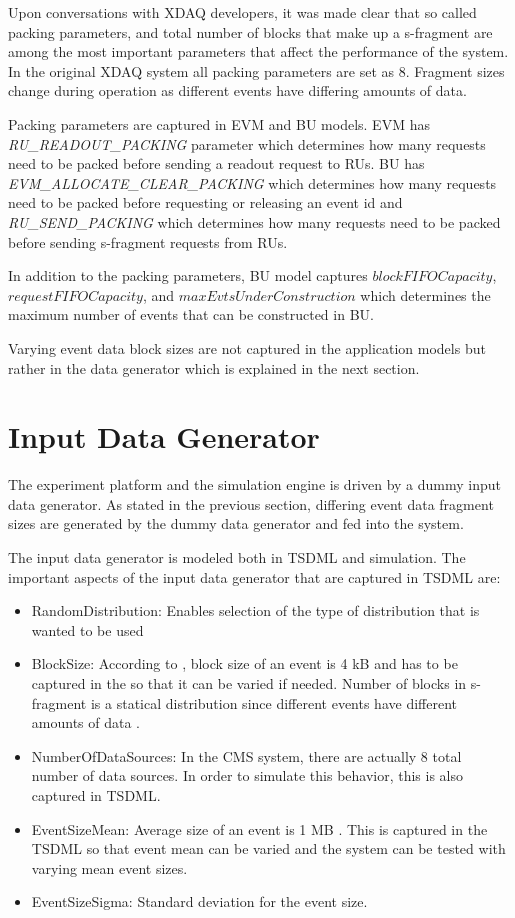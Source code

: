 Upon conversations with XDAQ developers, it was made clear that so called packing parameters, and total number of blocks that make up a s-fragment are among the most important parameters that affect the performance of the system. In the original XDAQ system all packing parameters are set as $8$. Fragment sizes change during operation as different events have differing amounts of data. 

Packing parameters are captured in EVM and BU models. EVM has \textit{RU\_READOUT\_PACKING} parameter which determines how many requests need to be packed before sending a readout request to RUs. BU has \textit{EVM\_ALLOCATE\_CLEAR\_PACKING} which determines how many requests need to be packed before requesting or releasing an event id  and \textit{RU\_SEND\_PACKING} which determines how many requests need to be packed before sending s-fragment requests from RUs.

In addition to the packing parameters, BU model captures $blockFIFOCapacity$, $requestFIFOCapacity$, and $maxEvtsUnderConstruction$ which determines the maximum number of events that can be constructed in BU.

Varying event data block sizes are not captured in the application models but rather in the data generator which is explained in the next section. 

\section{Input Data Generator}
The experiment platform and the simulation engine is driven by a dummy input data generator. As stated in the previous section, differing event data fragment sizes are generated by the dummy data generator and fed into the system. 

The input data generator is modeled both in TSDML and simulation. The important aspects of the input data generator that are captured in TSDML are:

\begin{itemize}
	\item RandomDistribution: Enables selection of the type of distribution that is wanted to be used
	\item BlockSize: According to \cite{CMSTDR}, block size of an event is 4 kB and has to be captured in the so that it can be varied if needed. Number of blocks in s-fragment is a statical distribution since different events have different amounts of data \cite{CMSTDR}.
	\item NumberOfDataSources: In the CMS system, there are actually 8 total number of data sources. In order to simulate this behavior, this is also captured in TSDML.
	\item EventSizeMean: Average size of an event is 1 MB \cite{CMSTDR}. This is captured in the TSDML so that event mean can be varied and the system can be tested with varying mean event sizes.
	\item EventSizeSigma: Standard deviation for the event size.
\end{itemize}

